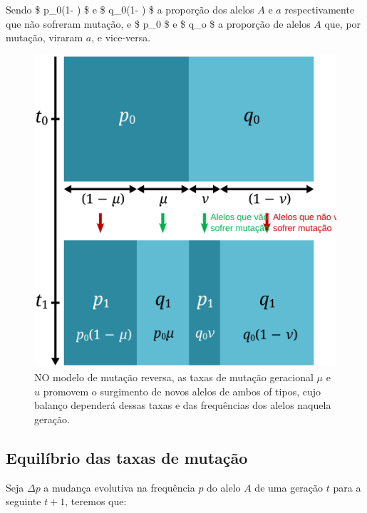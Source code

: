 \documentclass[
]{book}
\begin{document}
Sendo
\$ p\_0(1- \mu) \$ e \$ q\_0(1- \nu) \$ a proporção dos alelos \(A\) e \(a\) respectivamente que não sofreram mutação, e
\$ p\_0 \mu \$ e \$ q\_o \nu \$ a proporção de alelos \(A\) que, por mutação, viraram \(a\), e vice-versa.

\begin{figure}

{\centering \includegraphics[width=600px]{figs/mutation_bidirectional} 

}

\caption{NO modelo de mutação reversa, as taxas de mutação geracional $μ$ e $
u$ promovem o surgimento de novos alelos de ambos of tipos, cujo balanço dependerá dessas taxas e das frequências dos alelos naquela geração.}\label{fig:mutation2way}
\end{figure}

\hypertarget{equiluxedbrio-das-taxas-de-mutauxe7uxe3o}{%
\subsection{Equilíbrio das taxas de mutação}\label{equiluxedbrio-das-taxas-de-mutauxe7uxe3o}}

Seja \(\Delta p\) a mudança evolutiva na frequência \(p\) do alelo \(A\) de uma geração \(t\) para a seguinte \(t+1\), teremos que:
\end{document}

